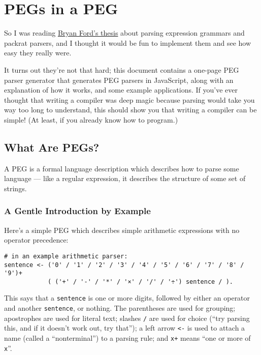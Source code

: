 \documentclass[
]{article}
\author{}
\date{}
\begin{document}
\hypertarget{pegs-in-a-peg}{%
\section{PEGs in a PEG}\label{pegs-in-a-peg}}

So I was reading
\href{http://pdos.csail.mit.edu/~baford/packrat/thesis/}{Bryan Ford's
thesis} about parsing expression grammars and packrat parsers, and I
thought it would be fun to implement them and see how easy they really
were.

It turns out they're not that hard; this document contains a one-page
PEG parser generator that generates PEG parsers in JavaScript, along
with an explanation of how it works, and some example applications. If
you've ever thought that writing a compiler was deep magic because
parsing would take you way too long to understand, this should show you
that writing a compiler can be simple! (At least, if you already know
how to program.)

\hypertarget{what-are-pegs}{%
\subsection{What Are PEGs?}\label{what-are-pegs}}

A PEG is a formal language description which describes how to parse some
language --- like a regular expression, it describes the structure of
some set of strings.

\hypertarget{a-gentle-introduction-by-example}{%
\subsubsection{A Gentle Introduction by
Example}\label{a-gentle-introduction-by-example}}

Here's a simple PEG which describes simple arithmetic expressions with
no operator precedence:

\begin{verbatim}
# in an example arithmetic parser:
sentence <- ('0' / '1' / '2' / '3' / '4' / '5' / '6' / '7' / '8' / '9')+ 
            ( ('+' / '-' / '*' / '×' / '/' / '÷') sentence / ).
\end{verbatim}

This says that a \texttt{sentence} is one or more digits, followed by
either an operator and another \texttt{sentence}, or nothing. The
parentheses are used for grouping; apostrophes
\texttt{\textquotesingle{}\textquotesingle{}} are used for literal text;
slashes \texttt{/} are used for choice (``try parsing this, and if it
doesn't work out, try that''); a left arrow \texttt{\textless{}-} is
used to attach a name (called a ``nonterminal'') to a parsing rule; and
\texttt{x+} means ``one or more of \texttt{x}''.
\end{document}
